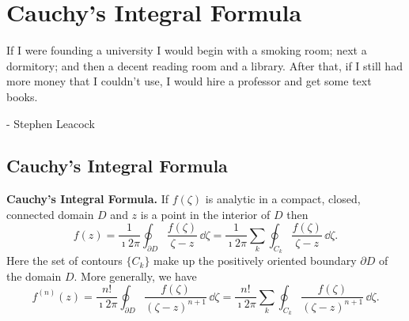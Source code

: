 
\flushbottom



\chapter{Cauchy's Integral Formula}







If I were founding a university I would begin with a smoking room; 
next a dormitory; and then a decent reading room and a library. 
After that, if I still had more money that I couldn't use, 
I would hire a professor and get some text books.

\begin{flushright}
  - Stephen Leacock
\end{flushright}










\section{Cauchy's Integral Formula}



\begin{Result}
  \label{cauchy}
  \textbf{Cauchy's Integral Formula.}
  If $f(\zeta)$ is analytic in a compact, closed, connected domain $D$ 
  and $z$ is a point in the interior of $D$ then
  \begin{equation}
    \label{eqn cauchy's integral formula}
    f(z) = \frac{1}{\imath 2 \pi} \oint_{\partial D} \frac{ f(\zeta) }{ \zeta - z } \,\dd \zeta
    = \frac{1}{\imath 2 \pi} \sum_k \oint_{C_k} \frac{ f(\zeta) }{ \zeta - z } \,\dd \zeta.
  \end{equation}
  Here the set of contours $\{ C_k \}$ make up the positively oriented boundary
  $\partial D$ of the domain $D$.  More generally, we have
  \begin{equation}
    \label{eqn cauchy's general integral formula}
    f^{(n)}(z) = \frac{n!}{\imath 2 \pi} \oint_{\partial D} \frac{ f(\zeta) }{ (\zeta - z)^{n+1} } \,\dd \zeta
    = \frac{n!}{\imath 2 \pi} \sum_k \oint_{C_k} \frac{ f(\zeta) }{ (\zeta - z)^{n+1} } \,\dd \zeta.
  \end{equation}
\end{Result}


